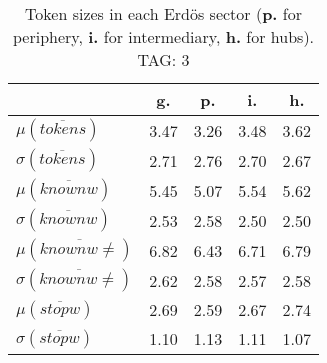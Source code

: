 \begin{table}[h!]
\begin{center}
\begin{tabular}{| l | c | c | c | c |}\hline
 & g. & p. & i. & h. \\\hline
$\mu(\overline{tokens})$ & 3.47  & 3.26  & 3.48  & 3.62 \\\hline
$\sigma(\overline{tokens})$ & 2.71  & 2.76  & 2.70  & 2.67 \\\hline
$\mu(\overline{knownw})$ & 5.45  & 5.07  & 5.54  & 5.62 \\\hline
$\sigma(\overline{knownw})$ & 2.53  & 2.58  & 2.50  & 2.50 \\\hline
$\mu(\overline{knownw \neq})$ & 6.82  & 6.43  & 6.71  & 6.79 \\\hline
$\sigma(\overline{knownw \neq})$ & 2.62  & 2.58  & 2.57  & 2.58 \\\hline
$\mu(\overline{stopw})$ & 2.69  & 2.59  & 2.67  & 2.74 \\\hline
$\sigma(\overline{stopw})$ & 1.10  & 1.13  & 1.11  & 1.07 \\\hline
\end{tabular}
\caption{Token sizes in each Erd\"os sector ({{\bf p.}} for periphery, {{\bf i.}} for intermediary, {{\bf h.}} for hubs). TAG: 3}
\end{center}
\end{table}